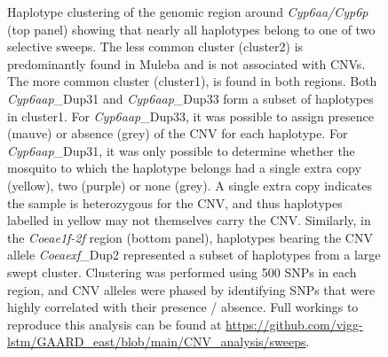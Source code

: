 \documentclass[a4paper,12pt]{article}
\begin{document}
\clearpage


\begin{figure}[h]
	\hspace{-0.9cm}
	\vskip 0.4cm
	\hspace{-0.9cm}
	\caption{\footnotesize Haplotype clustering of the genomic region around \textit{Cyp6aa/Cyp6p} (top panel) showing that nearly all haplotypes belong to one of two selective sweeps. The less common cluster (cluster2) is predominantly found in Muleba and is not associated with CNVs. The more common cluster (cluster1), is found in both regions. Both \textit{Cyp6aap}\_Dup31 and \textit{Cyp6aap}\_Dup33 form a subset of haplotypes in cluster1. For \textit{Cyp6aap}\_Dup33, it was possible to assign presence (mauve) or absence (grey) of the CNV for each haplotype. For \textit{Cyp6aap}\_Dup31, it was only possible to determine whether the mosquito to which the haplotype belongs had a single extra copy (yellow), two (purple) or none (grey). A single extra copy indicates the sample is heterozygous for the CNV, and thus haplotypes labelled in yellow may not themselves carry the CNV. Similarly, in the \textit{Coeae1f-2f} region (bottom panel), haplotypes bearing the CNV allele \textit{Coeaexf}\_Dup2 represented a subset of haplotypes from a large swept cluster. Clustering was performed using 500 SNPs in each region, and CNV alleles were phased by identifying SNPs that were highly correlated with their presence / absence. Full workings to reproduce this analysis can be found at \url{https://github.com/vigg-lstm/GAARD\_east/blob/main/CNV\_analysis/sweeps}.}
	\label{FigS6}
\end{figure}
\end{document}
